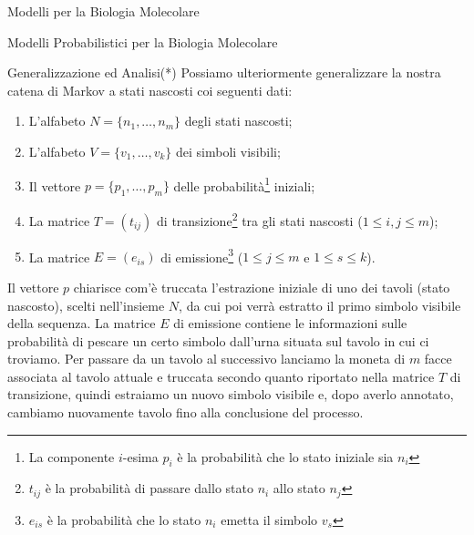 \documentclass{article}
\begin{document}
\begin{section}{Modelli per la Biologia Molecolare}
\begin{subsection}{Modelli Probabilistici per la Biologia Molecolare}
			\begin{subsubsection}{Generalizzazione ed Analisi(*)}
				Possiamo ulteriormente generalizzare la nostra catena di Markov a stati nascosti coi seguenti dati:
				\begin{enumerate}[1.]
					\item L’alfabeto $N = \{n_1, \ldots, n_m\}$ degli stati nascosti;
					\item L’alfabeto $V = \{v_1, \ldots, v_k\}$ dei simboli visibili;
					\item Il vettore $p = \{p_1, \ldots, p_m\}$ delle probabilità\footnote{La componente $i$-esima $p_i$ è la probabilità che lo stato iniziale sia $n_i$} iniziali;
					\item La matrice $T = (t_{ij})$ di transizione\footnote{$t_{ij}$ è la probabilità di passare dallo stato $n_i$ allo stato $n_j$} tra gli stati nascosti ($1\leq i,j\leq m$);
					\item La matrice $E = (e_{is})$ di emissione\footnote{$e_{is}$ è la probabilità che lo stato $n_i$ emetta il simbolo $v_s$} ($1\leq j\leq m$ e $1\leq s \leq k$).
				\end{enumerate}
				Il vettore $p$ chiarisce com'è truccata l’estrazione iniziale di uno dei tavoli (stato nascosto), scelti nell’insieme $N$, da cui poi verrà estratto il primo simbolo visibile della sequenza. 
				La matrice $E$ di emissione contiene le informazioni sulle probabilità di pescare un certo simbolo dall’urna situata sul tavolo in cui ci troviamo. 
				Per passare da un tavolo al successivo lanciamo la moneta di $m$ facce associata al tavolo attuale e truccata secondo quanto riportato nella matrice $T$ di transizione, quindi estraiamo un nuovo simbolo visibile e, dopo averlo annotato, cambiamo nuovamente tavolo fino alla conclusione del processo.
				

\end{subsubsection}
\end{subsection}
\end{section}
\end{document}
